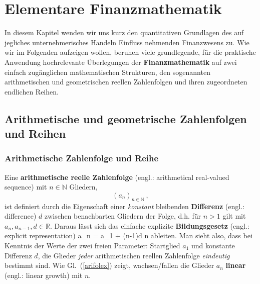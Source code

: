 \chapter[Elementare Finanzmathematik]%
{Elementare Finanzmathematik}
\hfill\hbox{}

\vspace{10mm}
\noindent
In diesem Kapitel wenden wir uns kurz den quantitativen
Grundlagen des auf jegliches unternehmerisches %
Handeln Einfluss nehmenden Finanzwesens zu.
Wie wir im Folgenden aufzeigen wollen, beruhen viele grundlegende,
f\"ur die praktische Anwendung hochrelevante \"Uberlegungen
der {\bf Finanzmathematik} auf zwei einfach zug\"anglichen
mathematischen Strukturen, den sogenannten arithmetischen und
geometrischen reellen Zahlenfolgen und ihren zugeordneten
endlichen Reihen.

\section[Arithmetische und geometrische Folgen und Reihen]%
{Arithmetische und geometrische Zahlenfolgen und Reihen}
\subsection{Arithmetische Zahlenfolge und Reihe}
Eine {\bf arithmetische reelle Zahlenfolge} (engl.: arithmetical 
real-valued sequence) mit $n \in \mathbb{N}$ Gliedern,
%
\[
(a_{n})_{n \in \mathbb{N}} \ ,
\]
%
ist definiert durch die Eigenschaft einer {\em konstant\/}
bleibenden {\bf Differenz} (engl.: difference) $d$ zwischen 
benachbarten Gliedern der Folge, d.h. f\"ur $n>1$ gilt
%
\be
{}
\ee
%
mit $a_{n}, a_{n-1}, d \in \mathbb{R}$. Daraus l\"asst sich das
einfache explizite {\bf Bildungsgesetz} (engl.: explicit 
representation)
%
\be
{}
a_{n} = a_{1} + (n-1)d
\quad{}\quad
n \in {}
\ee
%
ableiten. Man sieht also, dass bei Kenntnis der Werte der zwei
freien Parameter: Startglied $a_{1}$ und konstante Differenz $d$,
die Glieder {\em jeder\/} arithmetischen reellen Zahlenfolge
{\em eindeutig\/} bestimmt sind. Wie Gl.~(\ref{arifolex}) zeigt,
wachsen/fallen die Glieder $a_{n}$ {\bf linear} (engl.: linear 
growth) mit $n$.

